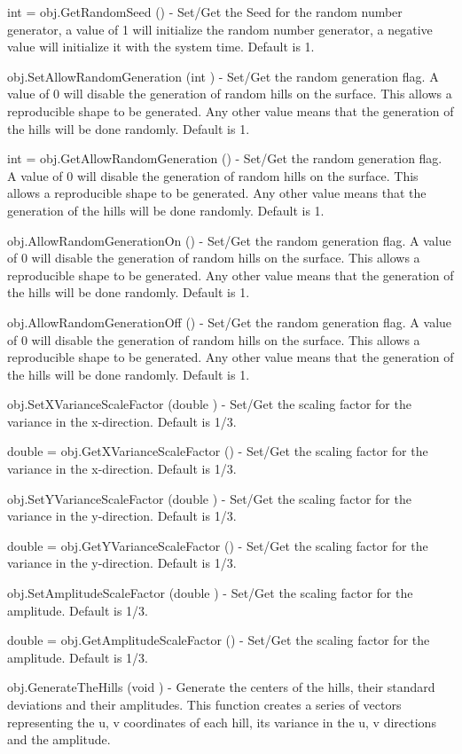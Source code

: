 \begin{DoxyItemize}
\item {\ttfamily int = obj.\-Get\-Random\-Seed ()} -\/ Set/\-Get the Seed for the random number generator, a value of 1 will initialize the random number generator, a negative value will initialize it with the system time. Default is 1.  
\item {\ttfamily obj.\-Set\-Allow\-Random\-Generation (int )} -\/ Set/\-Get the random generation flag. A value of 0 will disable the generation of random hills on the surface. This allows a reproducible shape to be generated. Any other value means that the generation of the hills will be done randomly. Default is 1.  
\item {\ttfamily int = obj.\-Get\-Allow\-Random\-Generation ()} -\/ Set/\-Get the random generation flag. A value of 0 will disable the generation of random hills on the surface. This allows a reproducible shape to be generated. Any other value means that the generation of the hills will be done randomly. Default is 1.  
\item {\ttfamily obj.\-Allow\-Random\-Generation\-On ()} -\/ Set/\-Get the random generation flag. A value of 0 will disable the generation of random hills on the surface. This allows a reproducible shape to be generated. Any other value means that the generation of the hills will be done randomly. Default is 1.  
\item {\ttfamily obj.\-Allow\-Random\-Generation\-Off ()} -\/ Set/\-Get the random generation flag. A value of 0 will disable the generation of random hills on the surface. This allows a reproducible shape to be generated. Any other value means that the generation of the hills will be done randomly. Default is 1.  
\item {\ttfamily obj.\-Set\-X\-Variance\-Scale\-Factor (double )} -\/ Set/\-Get the scaling factor for the variance in the x-\/direction. Default is 1/3.  
\item {\ttfamily double = obj.\-Get\-X\-Variance\-Scale\-Factor ()} -\/ Set/\-Get the scaling factor for the variance in the x-\/direction. Default is 1/3.  
\item {\ttfamily obj.\-Set\-Y\-Variance\-Scale\-Factor (double )} -\/ Set/\-Get the scaling factor for the variance in the y-\/direction. Default is 1/3.  
\item {\ttfamily double = obj.\-Get\-Y\-Variance\-Scale\-Factor ()} -\/ Set/\-Get the scaling factor for the variance in the y-\/direction. Default is 1/3.  
\item {\ttfamily obj.\-Set\-Amplitude\-Scale\-Factor (double )} -\/ Set/\-Get the scaling factor for the amplitude. Default is 1/3.  
\item {\ttfamily double = obj.\-Get\-Amplitude\-Scale\-Factor ()} -\/ Set/\-Get the scaling factor for the amplitude. Default is 1/3.  
\item {\ttfamily obj.\-Generate\-The\-Hills (void )} -\/ Generate the centers of the hills, their standard deviations and their amplitudes. This function creates a series of vectors representing the u, v coordinates of each hill, its variance in the u, v directions and the amplitude.


\end{DoxyItemize}
